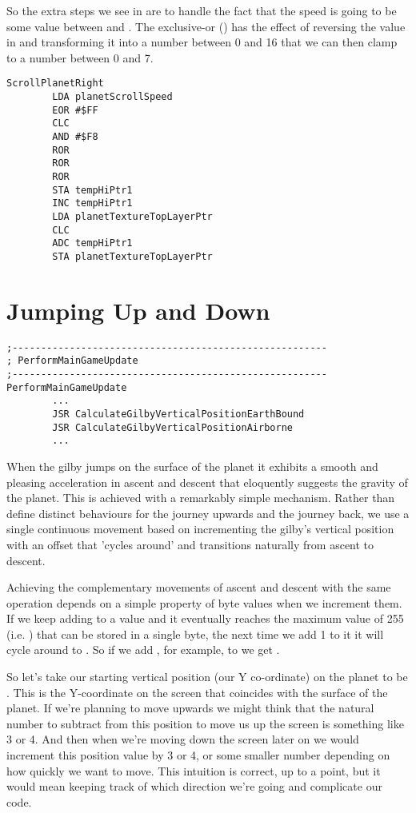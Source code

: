 So the extra steps we see in  are to handle the fact that the speed is going to be some value
between  and . The exclusive-or () has the effect of reversing the value in 
and transforming it into a number between 0 and 16 that we can then clamp to a number between 0 and 7.


\begin{lstlisting}
ScrollPlanetRight   
        LDA planetScrollSpeed
        EOR #$FF
        CLC
        AND #$F8
        ROR
        ROR
        ROR
        STA tempHiPtr1
        INC tempHiPtr1
        LDA planetTextureTopLayerPtr
        CLC
        ADC tempHiPtr1
        STA planetTextureTopLayerPtr
\end{lstlisting}


\section{Jumping Up and Down}
\begin{lstlisting}[caption=The routines responsible for updating the Gilby's vertical position.]
;-------------------------------------------------------
; PerformMainGameUpdate
;-------------------------------------------------------
PerformMainGameUpdate
        ...
        JSR CalculateGilbyVerticalPositionEarthBound
        JSR CalculateGilbyVerticalPositionAirborne
        ...

\end{lstlisting}
When the gilby jumps on the surface of the planet it exhibits a smooth and pleasing acceleration in ascent and descent that
eloquently suggests the gravity of the planet. This is achieved with a remarkably simple mechanism. Rather than define
distinct behaviours for the journey upwards and the journey back, we use a single continuous movement based on incrementing
the gilby's vertical position with an offset that 'cycles around' and transitions naturally from ascent to descent.

Achieving the complementary movements of ascent and descent with the same operation depends on a simple property of byte values when we increment them. If we keep adding
to a value and it eventually reaches the maximum value of 255 (i.e. ) that can be stored in a single byte,
 the next time we add 1 to it it will cycle around to . So if we add , for example, to  
 we get . 

So let's take our starting vertical position (our Y co-ordinate) on the planet to be . This is the Y-coordinate on the
screen that coincides with the surface of the planet. If we're planning to move upwards we might think that the natural number
to subtract from this position to move us up the screen is something like 3 or 4. And then when we're moving down the screen later
on we would increment this position value by 3 or 4, or some smaller number depending on how quickly we want to move. This intuition
is correct, up to a point, but it would mean keeping track of which direction we're going and complicate our code.

